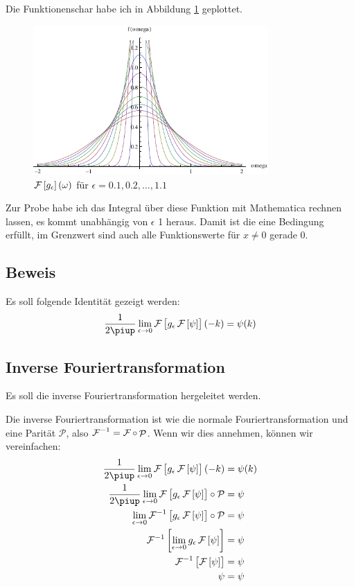Die Funktionenschar habe ich in Abbildung \ref{fig:Fourier} geplottet.

\begin{figure}
	\centering
	\includegraphics[width=0.8\textwidth]{Fouriertransformierte.pdf}
	\caption{$\fourier\sbr{g_\epsilon}(\omega)$ für $\epsilon = \num{0.1}, \num{0.2}, \ldots, \num{1.1}$}
	\label{fig:Fourier}
\end{figure}

Zur Probe habe ich das Integral über diese Funktion mit Mathematica rechnen
lassen, es kommt unabhängig von $\epsilon$ 1 heraus. Damit ist die eine
Bedingung erfüllt, im Grenzwert sind auch alle Funktionswerte für $x \neq 0$
gerade 0.

\subsection{Beweis}

\begin{problem}
	Es soll folgende Identität gezeigt werden:
	\[
		\frac1{2\piup} \lim_{\epsilon\to0} \fourier\sbr{g_\epsilon \fourier\sbr\psi}(-k)
		= \psi(k)
	\]
\end{problem}

\fehlt

\subsection{Inverse Fouriertransformation}

Es soll die inverse Fouriertransformation hergeleitet werden.

Die inverse Fouriertransformation ist wie die normale Fouriertransformation und
eine Parität $\mathcal P$, also $\operatorname{\mathcal{F}}^{-1} = \operatorname{\mathcal{F}} \circ
\mathop{\mathcal P}$. Wenn wir dies annehmen, können wir vereinfachen:
\begin{align*}
	\frac1{2\piup} \lim_{\epsilon\to0} \fourier\sbr{g_\epsilon \fourier\sbr\psi}(-k)
	&= \psi(k) \\
	\frac1{2\piup} \lim_{\epsilon\to0} \fourier\sbr{g_\epsilon \fourier\sbr\psi} \circ \mathcal P
	&= \psi \\
	\lim_{\epsilon\to0} \fourier^{-1}\sbr{g_\epsilon \fourier\sbr\psi} \circ \mathcal P
	&= \psi \\
	\fourier^{-1}\sbr{\lim_{\epsilon\to0} g_\epsilon \fourier\sbr\psi}
	&= \psi \\
	\fourier^{-1}\sbr{\fourier\sbr\psi}
	&= \psi \\
	\psi &= \psi
\end{align*}

